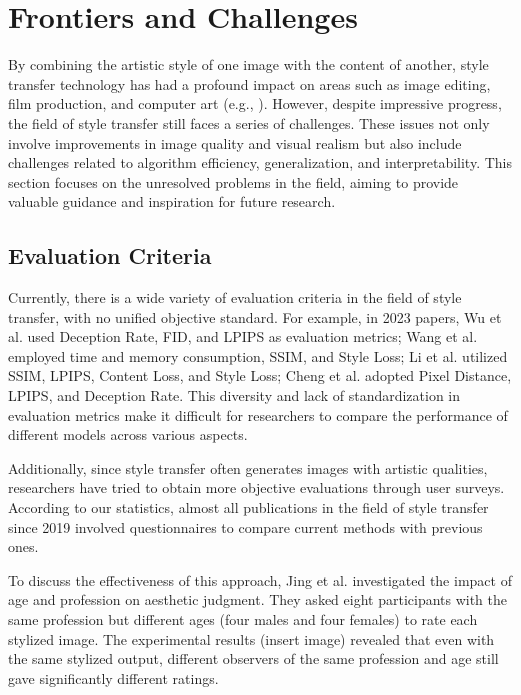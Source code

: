 \section{Frontiers and Challenges}

By combining the artistic style of one image with the content of another, style transfer technology has had a profound impact on areas such as image editing, film production, and computer art (e.g., \citep{05ke2023neural,20guan2022cdtnet,77wang2023deepvecfont}).
However, despite impressive progress, the field of style transfer still faces a series of challenges. These issues not only involve improvements in image quality and visual realism but also include challenges related to algorithm efficiency, generalization, and interpretability. This section focuses on the unresolved problems in the field, aiming to provide valuable guidance and inspiration for future research.

\subsection{Evaluation Criteria}

Currently, there is a wide variety of evaluation criteria in the field of style transfer, with no unified objective standard. For example, in 2023 papers, Wu et al.\citep{47wu2023preserving} used Deception Rate, FID, and LPIPS as evaluation metrics; Wang et al.\citep{72wang2023microast} employed time and memory consumption, SSIM, and Style Loss; Li et al.\citep{78lin2023adacm} utilized SSIM, LPIPS, Content Loss, and Style Loss; Cheng et al.\citep{80cheng2023user} adopted Pixel Distance, LPIPS, and Deception Rate. This diversity and lack of standardization in evaluation metrics make it difficult for researchers to compare the performance of different models across various aspects.

Additionally, since style transfer often generates images with artistic qualities, researchers have tried to obtain more objective evaluations through user surveys. According to our statistics, almost all publications in the field of style transfer since 2019 involved questionnaires to compare current methods with previous ones.

To discuss the effectiveness of this approach, Jing et al.\citep{01jing2019neural} investigated the impact of age and profession on aesthetic judgment. They asked eight participants with the same profession but different ages (four males and four females) to rate each stylized image. The experimental results (insert image) revealed that even with the same stylized output, different observers of the same profession and age still gave significantly different ratings.

